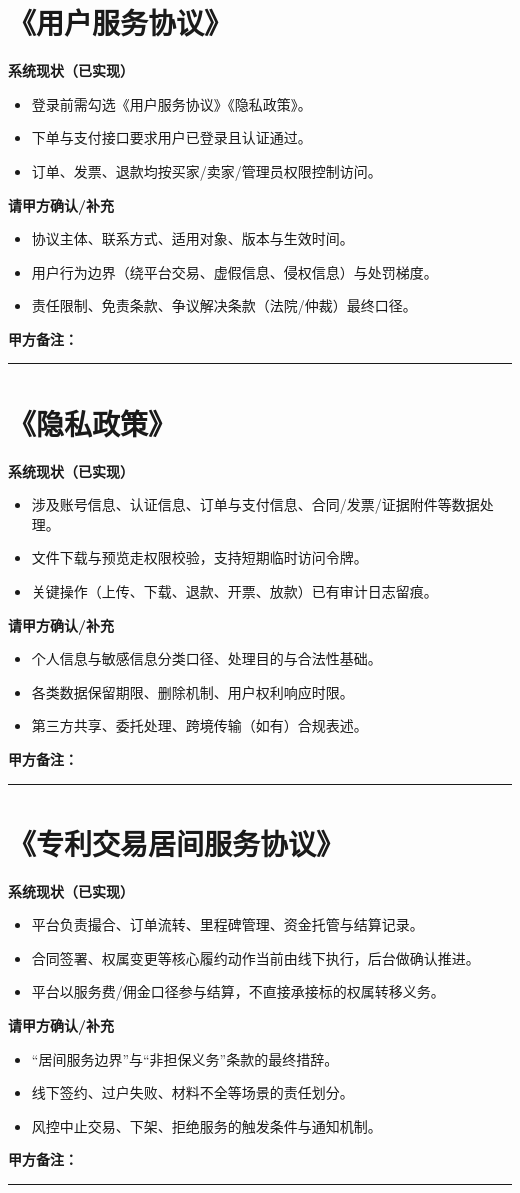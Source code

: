 \documentclass[12pt,a4paper]{ctexart}
\newcommand{\clientnote}{
\vspace{0.3em}
\noindent\textbf{甲方备注：}\par
\vspace{0.3em}
\noindent\rule{\textwidth}{0.4pt}\par
\vspace{1.0em}
}
\begin{document}
\section{《用户服务协议》}
\textbf{系统现状（已实现）}
\begin{itemize}
  \item 登录前需勾选《用户服务协议》《隐私政策》。
  \item 下单与支付接口要求用户已登录且认证通过。
  \item 订单、发票、退款均按买家/卖家/管理员权限控制访问。
\end{itemize}
\textbf{请甲方确认/补充}
\begin{itemize}
  \item 协议主体、联系方式、适用对象、版本与生效时间。
  \item 用户行为边界（绕平台交易、虚假信息、侵权信息）与处罚梯度。
  \item 责任限制、免责条款、争议解决条款（法院/仲裁）最终口径。
\end{itemize}
\clientnote

\section{《隐私政策》}
\textbf{系统现状（已实现）}
\begin{itemize}
  \item 涉及账号信息、认证信息、订单与支付信息、合同/发票/证据附件等数据处理。
  \item 文件下载与预览走权限校验，支持短期临时访问令牌。
  \item 关键操作（上传、下载、退款、开票、放款）已有审计日志留痕。
\end{itemize}
\textbf{请甲方确认/补充}
\begin{itemize}
  \item 个人信息与敏感信息分类口径、处理目的与合法性基础。
  \item 各类数据保留期限、删除机制、用户权利响应时限。
  \item 第三方共享、委托处理、跨境传输（如有）合规表述。
\end{itemize}
\clientnote

\section{《专利交易居间服务协议》}
\textbf{系统现状（已实现）}
\begin{itemize}
  \item 平台负责撮合、订单流转、里程碑管理、资金托管与结算记录。
  \item 合同签署、权属变更等核心履约动作当前由线下执行，后台做确认推进。
  \item 平台以服务费/佣金口径参与结算，不直接承接标的权属转移义务。
\end{itemize}
\textbf{请甲方确认/补充}
\begin{itemize}
  \item “居间服务边界”与“非担保义务”条款的最终措辞。
  \item 线下签约、过户失败、材料不全等场景的责任划分。
  \item 风控中止交易、下架、拒绝服务的触发条件与通知机制。
\end{itemize}
\clientnote
\end{document}

